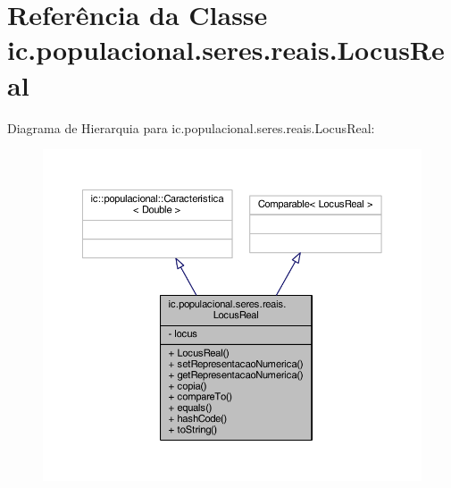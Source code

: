\hypertarget{classic_1_1populacional_1_1seres_1_1reais_1_1_locus_real}{\section{Referência da Classe ic.\-populacional.\-seres.\-reais.\-Locus\-Real}
\label{classic_1_1populacional_1_1seres_1_1reais_1_1_locus_real}
}


Diagrama de Hierarquia para ic.\-populacional.\-seres.\-reais.\-Locus\-Real\-:
\nopagebreak
\begin{figure}[H]
\begin{center}
\leavevmode
\includegraphics[width=350pt]{classic_1_1populacional_1_1seres_1_1reais_1_1_locus_real__inherit__graph}
\end{center}
\end{figure}


